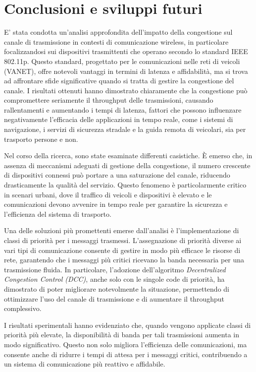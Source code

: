 \chapter{Conclusioni e sviluppi futuri}

E' stata condotta un'analisi approfondita dell'impatto della congestione sul canale di trasmissione in contesti di comunicazione wireless, in particolare focalizzandosi sui dispositivi trasmittenti che operano secondo lo standard IEEE 802.11p. Questo standard, progettato per le comunicazioni nelle reti di veicoli (VANET), offre notevoli vantaggi in termini di latenza e affidabilità, ma si trova ad affrontare sfide significative quando si tratta di gestire la congestione del canale. I risultati ottenuti hanno dimostrato chiaramente che la congestione può compromettere seriamente il throughput delle trasmissioni, causando rallentamenti e aumentando i tempi di latenza, fattori che possono influenzare negativamente l'efficacia delle applicazioni in tempo reale, come i sistemi di navigazione, i servizi di sicurezza stradale e la guida remota di veicolari, sia per trasporto persone e non.

Nel corso della ricerca, sono state esaminate differenti casistiche. È emerso che, in assenza di meccanismi adeguati di gestione della congestione, il numero crescente di dispositivi connessi può portare a una saturazione del canale, riducendo drasticamente la qualità del servizio. Questo fenomeno è particolarmente critico in scenari urbani, dove il traffico di veicoli e dispositivi è elevato e le comunicazioni devono avvenire in tempo reale per garantire la sicurezza e l'efficienza del sistema di trasporto.

Una delle soluzioni più promettenti emerse dall'analisi è l'implementazione di classi di priorità per i messaggi trasmessi. L'assegnazione di priorità diverse ai vari tipi di comunicazione consente di gestire in modo più efficace le risorse di rete, garantendo che i messaggi più critici ricevano la banda necessaria per una trasmissione fluida. In particolare, l’adozione dell’algoritmo \textit{Decentralized Congestion Control (DCC)}, anche
solo con le singole code di priorità, ha dimostrato di poter migliorare notevolmente la situazione, permettendo di ottimizzare l'uso del canale di trasmissione e di aumentare il throughput complessivo.

I risultati sperimentali hanno evidenziato che, quando vengono applicate classi di priorità più elevate, la disponibilità di banda per tali trasmissioni aumenta in modo significativo. Questo non solo migliora l'efficienza delle comunicazioni, ma consente anche di ridurre i tempi di attesa per i messaggi critici, contribuendo a un sistema di comunicazione più reattivo e affidabile.

